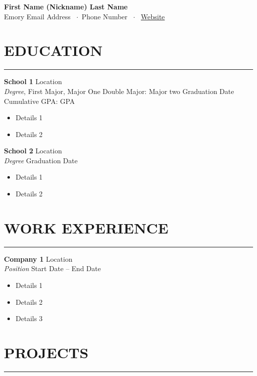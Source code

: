 \documentclass[10.5pt]{article}
\begin{document}
\noindent
\begin{center}
{\Large \textbf{\fontsize{14pt}{14pt}\selectfont First Name (Nickname) Last Name}} \\
Emory Email Address \faEnvelope~$\cdot$~Phone Number \faPhone~$\cdot$~
\href{https://www.linkedin.com/in/janehershman/}{Website  \faInfo}
\end{center}

\section*{\large\textbf{EDUCATION}}
\vspace{-\baselineskip}
\noindent\rule{\textwidth}{0.4pt}

\noindent
\textbf{School 1} \hfill Location \\
\emph{Degree}, First Major, Major One
Double Major: Major two \hfill Graduation Date
Cumulative GPA: GPA
\begin{itemize}
    \item Details 1
    \item Details 2
\end{itemize}


\noindent
\textbf{School 2} \hfill Location \\
\emph{Degree}  \hfill Graduation Date
\begin{itemize}
    \item Details 1
    \item Details 2
\end{itemize} 

\section*{\large\textbf{WORK EXPERIENCE}}
\vspace{-\baselineskip}
\noindent\rule{\textwidth}{0.4pt}

\noindent
\textbf{Company 1} \hfill Location \\
\emph{Position} \hfill Start Date -- End Date
\begin{itemize}
    \item Details 1
    \item Details 2
    \item Details 3
\end{itemize}


\section*{\large\textbf{PROJECTS}}
\vspace{-\baselineskip}
\noindent\rule{\textwidth}{0.4pt}
\end{document}
